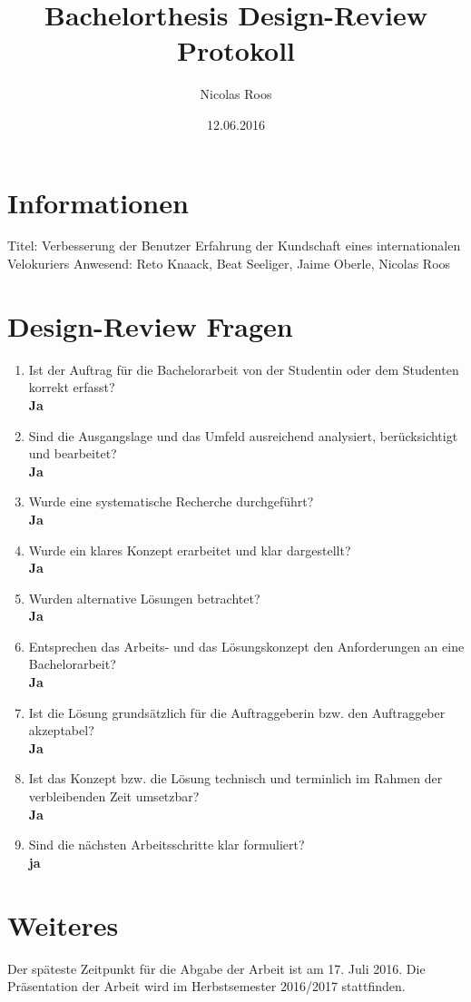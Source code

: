 \documentclass[a4paper]{article}
\begin{document}
\title{Bachelorthesis Design-Review Protokoll}
\author{Nicolas Roos}
\date{12.06.2016}
\maketitle

\section{Informationen}

Titel: Verbesserung der Benutzer Erfahrung der Kundschaft eines internationalen Velokuriers
\newline{}
\newline{}
Anwesend: Reto Knaack, Beat Seeliger, Jaime Oberle, Nicolas Roos

\section{Design-Review Fragen}

\begin{enumerate}
\item Ist der Auftrag für die Bachelorarbeit von der Studentin oder dem Studenten korrekt erfasst? \\ \textbf{Ja}
\item Sind die Ausgangslage und das Umfeld ausreichend analysiert, berücksichtigt und bearbeitet? \\ \textbf{Ja}
\item Wurde eine systematische Recherche durchgeführt? \\ \textbf{Ja}
\item Wurde ein klares Konzept erarbeitet und klar dargestellt? \\ \textbf{Ja}
\item Wurden alternative Lösungen betrachtet? \\ \textbf{Ja}
\item Entsprechen das Arbeits- und das Lösungskonzept den Anforderungen an eine Bachelorarbeit? \\ \textbf{Ja}
\item Ist die Lösung grundsätzlich für die Auftraggeberin bzw. den Auftraggeber akzeptabel? \\ \textbf{Ja}
\item Ist das Konzept bzw. die Lösung technisch und terminlich im Rahmen der verbleibenden Zeit umsetzbar? \\ \textbf{Ja}
\item Sind die nächsten Arbeitsschritte klar formuliert? \\ \textbf{ja}
\end{enumerate}

\section{Weiteres}

Der späteste Zeitpunkt für die Abgabe der Arbeit ist am 17. Juli 2016.  Die Präsentation der Arbeit wird im Herbstsemester 2016/2017 stattfinden.
\end{document}
